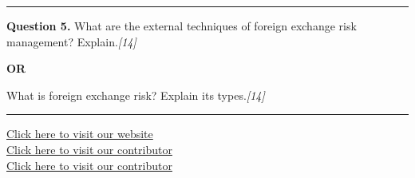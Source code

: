 \documentclass[11pt,a4paper]{article}
\newcommand{\pts}[1]{\hfill   \textit{[#1]}}
\begin{document}
\medskip\rule{\linewidth}{0.2pt}




\noindent   \textbf{Question 5.}
What are the external techniques of foreign exchange risk management? Explain.\pts{14}

\centerline{   \textbf{OR}}

What is foreign exchange risk? Explain its types.\pts{14}

\vfill
\rule{\linewidth}{0.4pt}

\begin{center}\small
\href{https://bhu-exam.vercel.app/}{Click here to visit our website}\\[4pt]
\href{https://me-aryan.vercel.app/}{Click here to visit our contributor}\\[4pt]
\href{https://quashan-me.vercel.app/}{Click here to visit our contributor}
\end{center}
\end{document}
